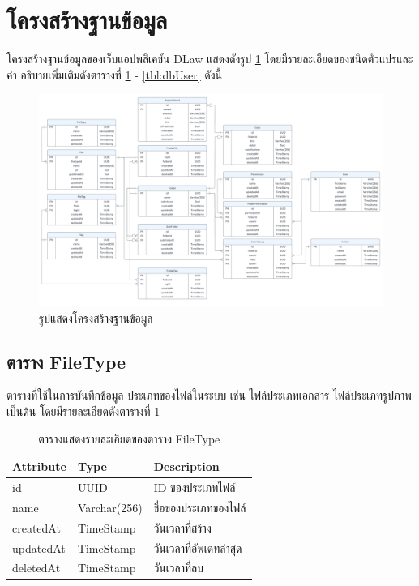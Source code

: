 \documentclass[12pt,oneside,openright,a4paper]{cpe-thai-project}
\begin{document}
\section{โครงสร้างฐานข้อมูล}
\hspace*{1cm}โครงสร้างฐานข้อมูลของเว็บแอปพลิเคชัน DLaw แสดงดังรูป \ref{fig:erDiagram}  โดยมีรายละเอียดของชนิดตัวแปรและคํา
อธิบายเพิ่มเติมดังตารางที่ \ref{tbl:dbFileType} - \ref{tbl:dbUser} ดังนี้
\begin{figure}[!h]\centering
    \includegraphics[width=16cm]{./assets/er-diagram.png}
    \caption{รูปแสดงโครงสร้างฐานข้อมูล}\label{fig:erDiagram}
\end{figure}

\subsection{ตาราง FileType}
ตารางที่ใช้ในการบันทึกข้อมูล ประเภทของไฟล์ในระบบ เช่น ไฟล์ประเภทเอกสาร ไฟล์ประเภทรูปภาพ เป็นต้น โดยมีรายละเอียดดังตารางที่ \ref{tbl:dbFileType}
\begin{table}[!h]
    \centering
    \begin{tabular}{|l|l|l|}
    \hline
    \textbf{Attribute} & \textbf{Type} & \textbf{Description}   \\ \hline
    id                 & UUID          & ID ของประเภทไฟล์       \\ \hline
    name               & Varchar(256)   & ชื่อของประเภทของไฟล์   \\ \hline
    createdAt          & TimeStamp     & วันเวลาที่สร้าง        \\ \hline
    updatedAt          & TimeStamp     & วันเวลาที่อัพเดทล่าสุด \\ \hline
    deletedAt          & TimeStamp     & วันเวลาที่ลบ           \\ \hline
    \end{tabular}
    \caption{\centering  ตารางแสดงรายละเอียดของตาราง FileType} \label{tbl:dbFileType}
\end{table}
\end{document}
